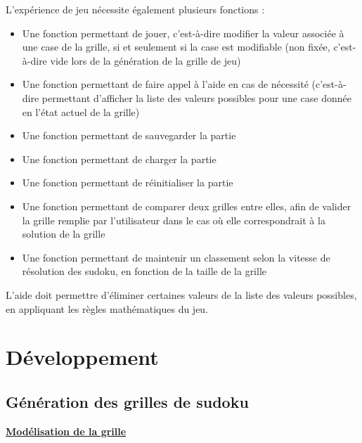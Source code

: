 \documentclass[a4paper, 12pt]{article}
\begin{document}
	\par L'expérience de jeu nécessite également plusieurs fonctions :
	\begin{itemize}
		\item Une fonction permettant de jouer, c'est-à-dire modifier la valeur associée à une case de la grille, si et seulement si la case est modifiable (non fixée, c'est-à-dire vide lors de la génération de la grille de jeu)
		\item Une fonction permettant de faire appel à l'aide en cas de nécessité (c'est-à-dire permettant d'afficher la liste des valeurs possibles pour une case donnée en l'état actuel de la grille)
		\item Une fonction permettant de sauvegarder la partie
		\item Une fonction permettant de charger la partie
		\item Une fonction permettant de réinitialiser la partie
		\item Une fonction permettant de comparer deux grilles entre elles, afin de valider la grille remplie par l'utilisateur dans le cas où elle correspondrait à la solution de la grille
		\item Une fonction permettant de maintenir un classement selon la vitesse de résolution des sudoku, en fonction de la taille de la grille\\
	\end{itemize}

	\par L'aide doit permettre d'éliminer certaines valeurs de la liste des valeurs possibles, en appliquant les règles mathématiques du jeu.

\clearpage
\section{Développement}

\subsection{Génération des grilles de sudoku}

\underline{\textbf{Modélisation de la grille}}
\end{document}
